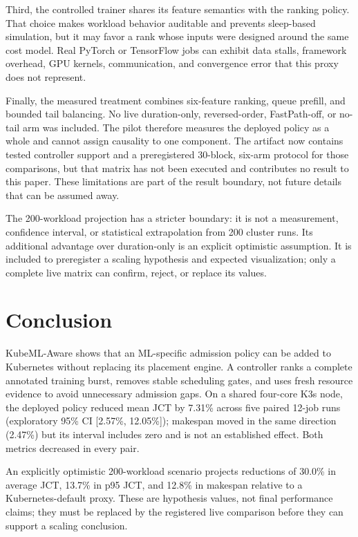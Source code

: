 \documentclass[10pt,journal,compsoc]{IEEEtran}
\newcommand{\system}{KubeML-Aware}
\begin{document}
Third, the controlled trainer shares its feature semantics with the ranking policy. That choice makes workload behavior auditable and prevents sleep-based simulation, but it may favor a rank whose inputs were designed around the same cost model. Real PyTorch or TensorFlow jobs can exhibit data stalls, framework overhead, GPU kernels, communication, and convergence error that this proxy does not represent.

Finally, the measured treatment combines six-feature ranking, queue prefill, and bounded tail balancing. No live duration-only, reversed-order, FastPath-off, or no-tail arm was included. The pilot therefore measures the deployed policy as a whole and cannot assign causality to one component. The artifact now contains tested controller support and a preregistered 30-block, six-arm protocol for those comparisons, but that matrix has not been executed and contributes no result to this paper. These limitations are part of the result boundary, not future details that can be assumed away.

The 200-workload projection has a stricter boundary: it is not a measurement, confidence interval, or statistical extrapolation from 200 cluster runs. Its additional advantage over duration-only is an explicit optimistic assumption. It is included to preregister a scaling hypothesis and expected visualization; only a complete live matrix can confirm, reject, or replace its values.

\section{Conclusion}

\system{} shows that an ML-specific admission policy can be added to Kubernetes without replacing its placement engine. A controller ranks a complete annotated training burst, removes stable scheduling gates, and uses fresh resource evidence to avoid unnecessary admission gaps. On a shared four-core K3s node, the deployed policy reduced mean JCT by 7.31\% across five paired 12-job runs (exploratory 95\% CI [2.57\%, 12.05\%]); makespan moved in the same direction (2.47\%) but its interval includes zero and is not an established effect. Both metrics decreased in every pair.

An explicitly optimistic 200-workload scenario projects reductions of 30.0\% in average JCT, 13.7\% in p95 JCT, and 12.8\% in makespan relative to a Kubernetes-default proxy. These are hypothesis values, not final performance claims; they must be replaced by the registered live comparison before they can support a scaling conclusion.
\end{document}
